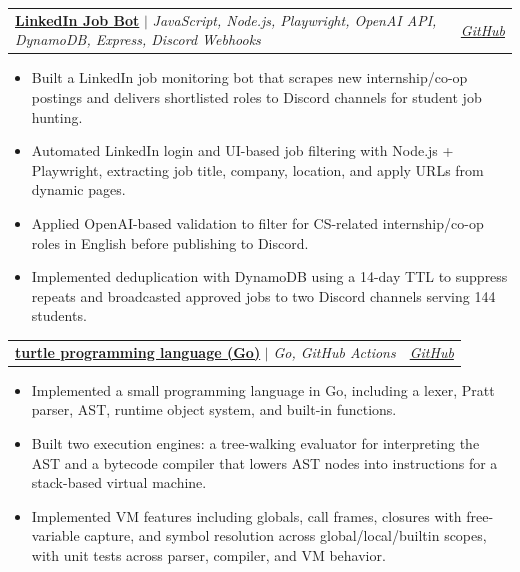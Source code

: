 \documentclass[letterpaper,11pt]{article}
\makeatletter
\newcommand{\resumeItem}[1]{
  \item\small{
    {#1 \vspace{-2pt}}
  }
}
\newcommand{\resumeProjectHeading}[2]{
    \item
    \begin{tabular*}{0.97\textwidth}{l@{\extracolsep{\fill}}r}
      \small#1 & #2 \\
    \end{tabular*}\vspace{-7pt}
}
\newcommand{\resumeItemListStart}{\begin{itemize}}
\newcommand{\resumeItemListEnd}{\end{itemize}\vspace{-5pt}}
\makeatother
\begin{document}
    \resumeProjectHeading
        {\textbf{\href{https://GitHub.com/matoanbach/not/tree/main/LinkedIn\%20Bot}{LinkedIn Job Bot}} $|$ \emph{JavaScript, Node.js, Playwright, OpenAI API, DynamoDB, Express, Discord Webhooks}}{\emph{\href{https://GitHub.com/matoanbach/not/tree/main/LinkedIn\%20Bot}{GitHub}}}
        \resumeItemListStart
          \resumeItem{Built a LinkedIn job monitoring bot that scrapes new internship/co-op postings and delivers shortlisted roles to Discord channels for student job hunting.}
          \resumeItem{Automated LinkedIn login and UI-based job filtering with Node.js + Playwright, extracting job title, company, location, and apply URLs from dynamic pages.}
          \resumeItem{Applied OpenAI-based validation to filter for CS-related internship/co-op roles in English before publishing to Discord.}
          \resumeItem{Implemented deduplication with DynamoDB using a 14-day TTL to suppress repeats and broadcasted approved jobs to two Discord channels serving 144 students.}
        \resumeItemListEnd
        

        \resumeProjectHeading
          {\textbf{\href{https://GitHub.com/matoanbach/go-compiler}{turtle programming language (Go)}} $|$ \emph{Go, GitHub Actions}}
          {\emph{\href{https://GitHub.com/matoanbach/go-compiler}{GitHub}}}
        \resumeItemListStart
          \resumeItem{Implemented a small programming language in Go, including a lexer, Pratt parser, AST, runtime object system, and built-in functions.}
          \resumeItem{Built two execution engines: a tree-walking evaluator for interpreting the AST and a bytecode compiler that lowers AST nodes into instructions for a stack-based virtual machine.}
          \resumeItem{Implemented VM features including globals, call frames, closures with free-variable capture, and symbol resolution across global/local/builtin scopes, with unit tests across parser, compiler, and VM behavior.}
        \resumeItemListEnd
\end{document}
